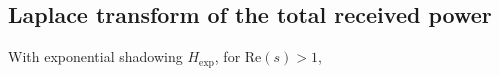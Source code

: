 \documentclass[lettersize,journal]{IEEEtran}
\begin{document}





\subsection{Laplace transform of the total received power}

With exponential shadowing ${H}_{\text{exp}}$, for Re$(s)>1$,
\end{document}
